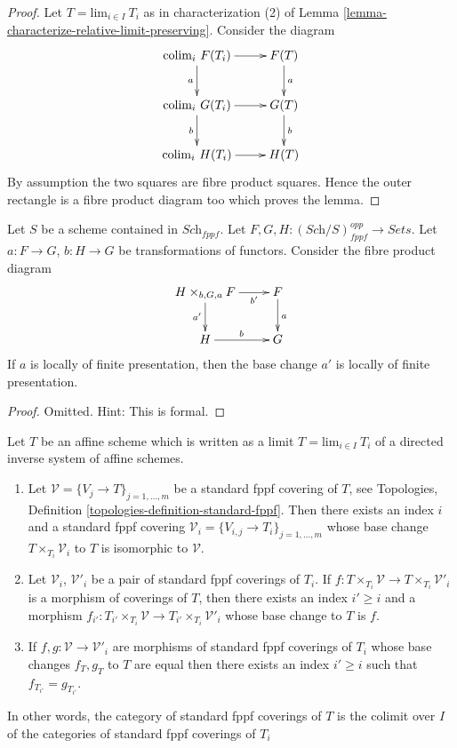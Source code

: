 \begin{proof}
Let $T = \text{lim}_{i \in I}\ T_i$ as in characterization (2) of
Lemma \ref{lemma-characterize-relative-limit-preserving}.
Consider the diagram
$$
\xymatrix{
\text{colim}_i\ F(T_i) \ar[r] \ar[d]_a & F(T) \ar[d]^a \\
\text{colim}_i\ G(T_i) \ar[r] \ar[d]_b & G(T) \ar[d]^b \\
\text{colim}_i\ H(T_i) \ar[r] & H(T)
}
$$
By assumption the two squares are fibre product squares. Hence the
outer rectangle is a fibre product diagram too which proves the lemma.
\end{proof}

\begin{lemma}
\label{lemma-base-change-locally-finite-presentation}
Let $S$ be a scheme contained in $\textit{Sch}_{fppf}$.
Let $F, G, H : (\textit{Sch}/S)_{fppf}^{opp} \to \textit{Sets}$.
Let $a : F \to G$, $b : H \to G$ be transformations of functors.
Consider the fibre product diagram
$$
\xymatrix{
H \times_{b, G, a} F \ar[r]_-{b'} \ar[d]_{a'} & F \ar[d]^a \\
H \ar[r]^b & G
}
$$
If $a$ is locally of finite presentation, then the base change $a'$ is
locally of finite presentation.
\end{lemma}

\begin{proof}
Omitted. Hint: This is formal.
\end{proof}

\begin{lemma}
\label{lemma-limit-fppf-topology}
Let $T$ be an affine scheme which is written as a limit
$T = \text{lim}_{i \in I}\ T_i$ of a directed inverse system of affine schemes.
\begin{enumerate}
\item Let $\mathcal{V} = \{V_j \to T\}_{j = 1, \ldots, m}$ be a standard fppf
covering of $T$, see
Topologies, Definition \ref{topologies-definition-standard-fppf}.
Then there exists an index $i$ and a standard fppf covering
$\mathcal{V}_i = \{V_{i, j} \to T_i\}_{j = 1, \ldots, m}$
whose base change $T \times_{T_i} \mathcal{V}_i$ to $T$
is isomorphic to $\mathcal{V}$.
\item Let $\mathcal{V}_i$, $\mathcal{V}'_i$ be a pair of standard
fppf coverings of $T_i$. If
$f : T \times_{T_i} \mathcal{V} \to T \times_{T_i} \mathcal{V}'_i$ is
a morphism of coverings of $T$, then there exists an index
$i' \geq i$ and a morphism
$f_{i'} : T_{i'} \times_{T_i} \mathcal{V} \to
T_{i'} \times_{T_i} \mathcal{V}'_i$
whose base change to $T$ is $f$.
\item If
$f, g : \mathcal{V} \to \mathcal{V}'_i$
are morphisms of standard fppf coverings of $T_i$ whose
base changes $f_T, g_T$ to $T$ are equal then there exists an
index $i' \geq i$ such that $f_{T_{i'}} = g_{T_{i'}}$.
\end{enumerate}
In other words, the category of standard fppf coverings of $T$ is
the colimit over $I$ of the categories of standard fppf coverings of $T_i$
\end{lemma}

